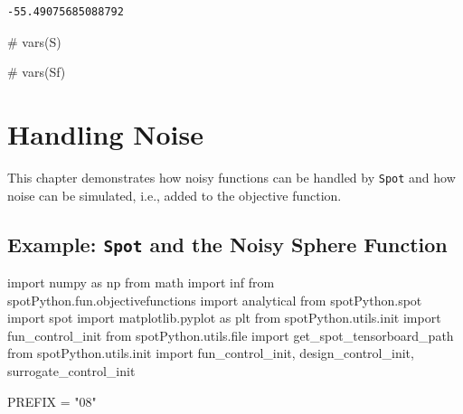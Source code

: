 \documentclass[
  letterpaper,
  DIV=11,
  numbers=noendperiod]{scrreprt}
\newenvironment{Shaded}{\begin{snugshade}}{\end{snugshade}}
\newcommand{\BuiltInTok}[1]{\textcolor[rgb]{0.00,0.23,0.31}{#1}}
\newcommand{\CommentTok}[1]{\textcolor[rgb]{0.37,0.37,0.37}{#1}}
\newcommand{\ImportTok}[1]{\textcolor[rgb]{0.00,0.46,0.62}{#1}}
\newcommand{\NormalTok}[1]{\textcolor[rgb]{0.00,0.23,0.31}{#1}}
\newcommand{\OperatorTok}[1]{\textcolor[rgb]{0.37,0.37,0.37}{#1}}
\newcommand{\StringTok}[1]{\textcolor[rgb]{0.13,0.47,0.30}{#1}}
\begin{document}
\begin{verbatim}
-55.49075685088792
\end{verbatim}

\begin{Shaded}
\begin{Highlighting}[]
\CommentTok{\# vars(S)}
\end{Highlighting}
\end{Shaded}

\begin{Shaded}
\begin{Highlighting}[]
\CommentTok{\# vars(Sf)}
\end{Highlighting}
\end{Shaded}

\chapter{Handling Noise}\label{sec-noise}

This chapter demonstrates how noisy functions can be handled by
\texttt{Spot} and how noise can be simulated, i.e., added to the
objective function.

\section{\texorpdfstring{Example: \texttt{Spot} and the Noisy Sphere
Function}{Example: Spot and the Noisy Sphere Function}}\label{example-spot-and-the-noisy-sphere-function}

\begin{Shaded}
\begin{Highlighting}[]
\ImportTok{import}\NormalTok{ numpy }\ImportTok{as}\NormalTok{ np}
\ImportTok{from}\NormalTok{ math }\ImportTok{import}\NormalTok{ inf}
\ImportTok{from}\NormalTok{ spotPython.fun.objectivefunctions }\ImportTok{import}\NormalTok{ analytical}
\ImportTok{from}\NormalTok{ spotPython.spot }\ImportTok{import}\NormalTok{ spot}
\ImportTok{import}\NormalTok{ matplotlib.pyplot }\ImportTok{as}\NormalTok{ plt}
\ImportTok{from}\NormalTok{ spotPython.utils.init }\ImportTok{import}\NormalTok{ fun\_control\_init}
\ImportTok{from}\NormalTok{ spotPython.utils.}\BuiltInTok{file} \ImportTok{import}\NormalTok{ get\_spot\_tensorboard\_path}
\ImportTok{from}\NormalTok{ spotPython.utils.init }\ImportTok{import}\NormalTok{ fun\_control\_init, design\_control\_init, surrogate\_control\_init}

\NormalTok{PREFIX }\OperatorTok{=} \StringTok{"08"}
\end{Highlighting}
\end{Shaded}
\end{document}
